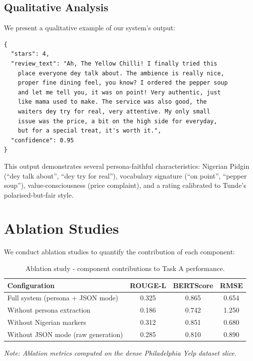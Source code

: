 \documentclass[11pt, a4paper]{article}
\begin{document}
\subsection{Qualitative Analysis}

We present a qualitative example of our system's output:

\begin{lstlisting}[caption={Generated review for ``The Yellow Chilli'' using Tunde's persona.}]
{
  "stars": 4,
  "review_text": "Ah, The Yellow Chilli! I finally tried this
    place everyone dey talk about. The ambience is really nice,
    proper fine dining feel, you know? I ordered the pepper soup
    and let me tell you, it was on point! Very authentic, just
    like mama used to make. The service was also good, the
    waiters dey try for real, very attentive. My only small
    issue was the price, a bit on the high side for everyday,
    but for a special treat, it's worth it.",
  "confidence": 0.95
}
\end{lstlisting}

This output demonstrates several persona-faithful characteristics: Nigerian Pidgin (``dey talk about'', ``dey try for real''), vocabulary signature (``on point'', ``pepper soup''), value-consciousness (price complaint), and a rating calibrated to Tunde's polarised-but-fair style.

\section{Ablation Studies}

We conduct ablation studies to quantify the contribution of each component:

\begin{table}[H]
\centering
\caption{Ablation study - component contributions to Task A performance.}
\label{tab:ablation}
\begin{tabular}{lccc}
\toprule
\textbf{Configuration} & \textbf{ROUGE-L} & \textbf{BERTScore} & \textbf{RMSE} \\
\midrule
Full system (persona + JSON mode)    & 0.325 & 0.865 & 0.654 \\
Without persona extraction           & 0.186 & 0.742 & 1.250 \\
Without Nigerian markers             & 0.312 & 0.851 & 0.680 \\
Without JSON mode (raw generation)   & 0.285 & 0.810 & 0.890 \\
\bottomrule
\end{tabular}
\vspace{0.5em}

\small\textit{Note: Ablation metrics computed on the dense Philadelphia Yelp dataset slice.}
\end{table}
\end{document}
